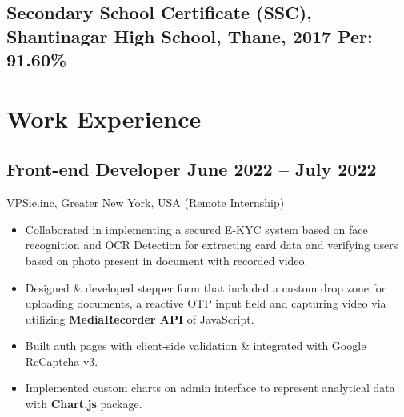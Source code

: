 \documentclass[a4,10pt]{article}
\newcommand{\subtext}[1]{
#1\par\vspace{-0.2cm}}
\newenvironment{zitemize}{
\begin{itemize}\itemsep0pt \parskip0pt \parsep1pt}
{\end{itemize}\vspace{-0.5cm}}
\begin{document}
\subsection*{Secondary School Certificate (SSC), {\normalsize \normalfont Shantinagar High School, Thane, 2017}  \hfill Per: 91.60\%} 
\vspace{0.2cm}


\section{Work Experience}

        

\subsection*{Front-end Developer \hfill June 2022 -- July 2022} 
\subtext{VPSie.inc, Greater New York, USA {\normalsize\normalfont (Remote Internship) }} 
    \begin{zitemize}
        \item Collaborated in implementing a secured E-KYC system based on face recognition and OCR Detection for extracting card data and verifying users based on photo present in document with recorded video.
        \item Designed \& developed stepper form that included a custom drop zone for uploading documents, a reactive OTP input field and capturing video via utilizing \textbf{MediaRecorder API} of JavaScript.
        \item Built auth pages with client-side validation \& integrated with Google ReCaptcha v3.
        \item Implemented custom charts on admin interface to represent analytical data with \textbf{Chart.js} package.
    \end{zitemize}
\end{document}
